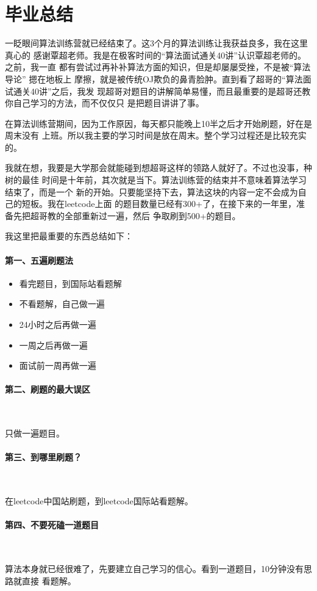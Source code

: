 \newpage
\section{毕业总结}

一眨眼间算法训练营就已经结束了。这3个月的算法训练让我获益良多，我在这里真心的
感谢覃超老师。我是在极客时间的``算法面试通关40讲''认识覃超老师的。之前，我一直
都有尝试过再补补算法方面的知识，但是却屡屡受挫，不是被``算法导论'' 摁在地板上
摩擦，就是被传统OJ欺负的鼻青脸肿。直到看了超哥的``算法面试通关40讲''之后，我发
现超哥对题目的讲解简单易懂，而且最重要的是超哥还教你自己学习的方法，而不仅仅只
是把题目讲讲了事。

在算法训练营期间，因为工作原因，每天都只能晚上10半之后才开始刷题，好在是周末没有
上班。所以我主要的学习时间是放在周末。整个学习过程还是比较充实的。

我就在想，我要是大学那会就能碰到想超哥这样的领路人就好了。不过也没事，种树的最佳
时间是十年前，其次就是当下。算法训练营的结束并不意味着算法学习结束了，而是一个
新的开始。只要能坚持下去，算法这块的内容一定不会成为自己的短板。我在leetcode上面
的题目数量已经有300+了，在接下来的一年里，准备先把超哥教的全部重新过一遍，然后
争取刷到500+的题目。

我这里把最重要的东西总结如下：

\paragraph{第一、五遍刷题法}

\begin{itemize}
  \item 看完题目，到国际站看题解
  \item 不看题解，自己做一遍
  \item 24小时之后再做一遍
  \item 一周之后再做一遍
  \item 面试前一周再做一遍
\end{itemize}

\paragraph{第二、刷题的最大误区} \

只做一遍题目。

\paragraph{第三、到哪里刷题？} \

在leetcode中国站刷题，到leetcode国际站看题解。

\paragraph{第四、不要死磕一道题目} \

算法本身就已经很难了，先要建立自己学习的信心。看到一道题目，10分钟没有思路就直接
看题解。


